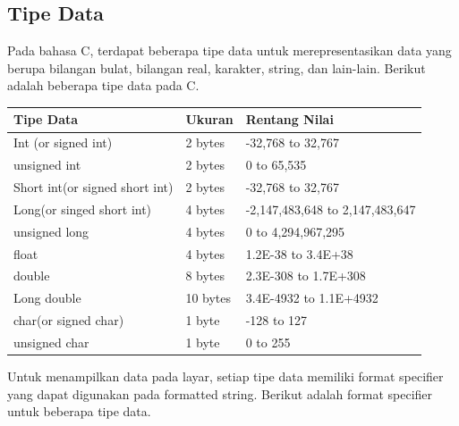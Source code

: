 \subsection{Tipe Data}
Pada bahasa C, terdapat beberapa tipe data untuk merepresentasikan data yang berupa bilangan bulat, bilangan real, karakter, string, dan lain-lain. Berikut adalah beberapa tipe data pada C.
\begin{center}
	\begin{tabular}{|l|l|l|}
		\hline
		Tipe Data                       & Ukuran   & Rentang Nilai                              \\ \hline
		Int (or signed int)            & 2 bytes  & -32,768 to 32,767                          \\ \hline
		unsigned int                   & 2 bytes  & 0 to 65,535                                \\ \hline
		Short int(or signed short int) & 2 bytes  & -32,768 to 32,767                          \\ \hline
		Long(or singed short int)      & 4 bytes  & -2,147,483,648 to 2,147,483,647            \\ \hline
		unsigned long                  & 4 bytes  & 0 to 4,294,967,295                         \\ \hline
		float                          & 4 bytes  & 1.2E-38 to 3.4E+38     						\\ \hline
		double                         & 8 bytes  & 2.3E-308 to 1.7E+308    					\\ \hline
		Long double                    & 10 bytes & 3.4E-4932 to 1.1E+4932 						 \\ \hline
		char(or signed char)           & 1 byte   & -128 to 127                                \\ \hline
		unsigned char                  & 1 byte   & 0 to 255                                   \\ \hline
	\end{tabular}
\end{center}
Untuk menampilkan data pada layar, setiap tipe data memiliki format specifier yang dapat digunakan pada formatted string. Berikut adalah format specifier untuk beberapa tipe data.
